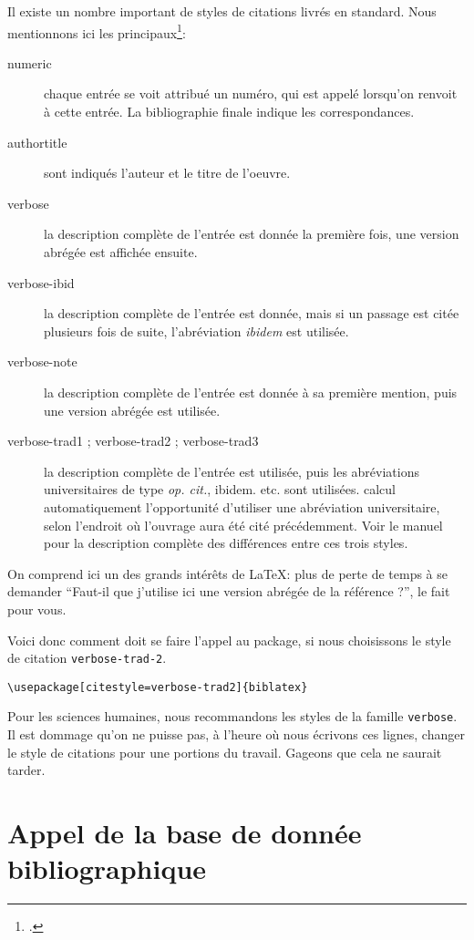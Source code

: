Il existe un nombre important de styles de citations livrés en standard. Nous mentionnons ici les principaux\footcite[Se reporter pour plus de détails à][]{biblatex_style}:
\begin{description}
\item[numeric]chaque entrée se voit attribué un numéro, qui est appelé lorsqu'on renvoit à cette entrée. La bibliographie finale indique les correspondances.
\item[authortitle]sont indiqués l'auteur et le titre de l'oeuvre.
\item[verbose]la description complète de l'entrée est donnée la première fois, une version abrégée est affichée ensuite.
\item[verbose-ibid]la description complète de l'entrée est donnée, mais si un passage est citée plusieurs fois de suite, l'abréviation \emph{ibidem} est utilisée.
\item[verbose-note]la description complète de l'entrée est donnée à sa première mention, puis une version abrégée est utilisée.
\item[verbose-trad1 ; verbose-trad2 ; verbose-trad3]la description complète de l'entrée est utilisée, puis les abréviations universitaires de type \emph{op. cit.}, {ibidem.} etc. sont utilisées.  calcul automatiquement l'opportunité d'utiliser une abréviation universitaire, selon l'endroit où l'ouvrage aura été cité précédemment. Voir le manuel pour la description complète des différences entre ces trois styles.
\end{description}

On comprend ici un des grands intérêts de \LaTeX : plus de perte de temps à se demander \enquote{Faut-il que j'utilise ici une version abrégée de la référence ?},  le fait pour vous.

Voici donc comment doit se faire l'appel au package, si nous choisissons le style de citation \verb|verbose-trad-2|.

\begin{verbatim}
\usepackage[citestyle=verbose-trad2]{biblatex}
\end{verbatim}

Pour les sciences humaines, nous recommandons les styles de la famille \verb|verbose|.
Il est dommage qu'on ne puisse pas, à l'heure où nous écrivons ces lignes, changer le style de citations pour une portions du travail. Gageons que cela ne saurait tarder. 

\section{Appel de la base de donnée bibliographique}


